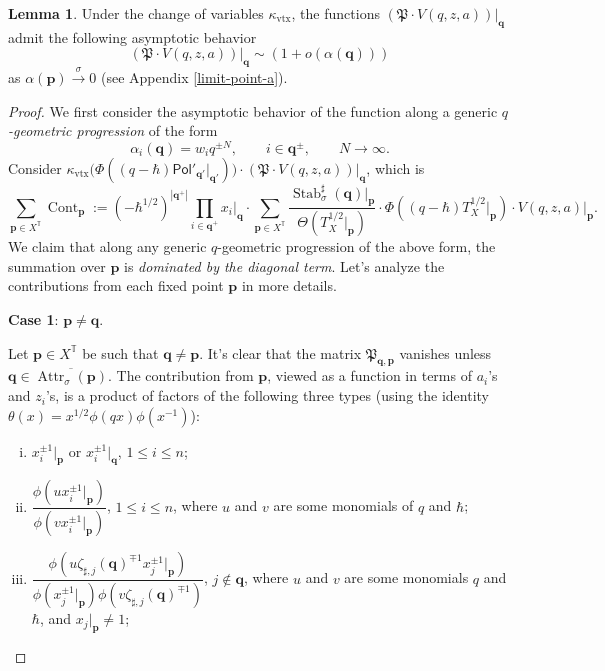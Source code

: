 \documentclass[10pt]{amsart}
\theoremstyle{definition}
\def\TT{\mathbb{T}}
\newcommand{\bp}{\mathbf{p}}
\newcommand{\bq}{\mathbf{q}}
\newcommand{\Attr}{\operatorname{Attr}}
\newcommand{\Cont}{\operatorname{Cont}}
\newcommand{\Stab}{\operatorname{Stab}}
\newcommand{\fP}{\mathfrak{P}}
\newcommand{\Pol}{\mathsf{Pol}}
\theoremstyle{definition}
\numberwithin{equation}{section}
\theoremstyle{Theorem}
\newtheorem{Lemma}[Definition]{Lemma}
\begin{document}
\begin{Lemma} \label{Criterion-2}
Under the change of variables $\kappa_{\mathrm{vtx}}$, the functions $( \fP \cdot V(q,z,a) ) \big|_\bq$ admit the following asymptotic behavior
$$
( \fP \cdot V(q,z,a) ) \big|_\bq \sim (1 + o(\alpha(\bq)))
$$
as $\alpha (\bp) \xrightarrow{\sigma} 0$ (see Appendix \ref{limit-point-a}).
\end{Lemma}

\begin{proof}
We first consider the asymptotic behavior of  the function along a generic \emph{$q$-geometric progression} of the form
$$
\alpha_i (\bq) = w_i q^{\pm N}, \qquad i\in \bq^\pm,  \qquad N\to \infty .
$$
Consider $\kappa_{\mathrm{vtx}} \Big( \Phi ((q-\hbar) \Pol'_{\bq'} |_{\bq'} ) \Big) \cdot (\fP \cdot V(q,z,a) ) \big|_\bq$, which is
$$
\sum_{\bp \in X^\TT} \Cont_\bp := (-\hbar^{1/2})^{|\bq^+|}  \prod_{i\in \bq^+} x_i |_\bq \cdot \sum_{\bp \in X^\TT}   \frac{ \Stab^\sharp_{\sigma} (\bq) |_\bp }{\Theta (T_X^{1/2} |_\bp ) } \cdot \Phi ((q-\hbar) T^{1/2}_X |_\bp )  \cdot V(q,z,a) \big|_\bp  .
$$
We claim that along any generic $q$-geometric progression of the above form, the summation over $\bp$ is \emph{dominated by the diagonal term}. Let's analyze the contributions from each fixed point $\bp$ in more details.

\textbf{Case 1}: $\bp \neq \bq$.

Let $\bp \in X^\TT$ be such that $\bq \neq \bp$. It's clear that the matrix $\fP_{\bq, \bp}$ vanishes unless $\bq\in \overline{\Attr_\sigma (\bp)}$.  The contribution from $\bp$, viewed as a function in terms of $a_i$'s and $z_i$'s, is a product of factors of the following three types (using the identity $\theta (x) = x^{1/2} \phi (qx) \phi (x^{-1})$):
\begin{enumerate}[(i)]
	
\setlength{\parskip}{1ex}
	
\item $x_i^{\pm 1} |_\bp$ or $x_i^{\pm 1} |_\bq$, $1\leq i\leq n$;

\item $\dfrac{\phi (u x_i^{\pm 1} |_\bp) }{\phi (v x_i^{\pm 1} |_\bp)}$, $1 \leq i\leq n$, where $u$ and $v$ are some monomials of $q$ and $\hbar$; 

\item $\dfrac{\phi (u \zeta_{\sharp, j} (\bq)^{\mp 1} x_j^{\pm 1} |_\bp) }{ \phi (x_j^{\pm 1} |_\bp) \phi (v \zeta_{\sharp, j} (\bq)^{\mp 1} )}$, $j\not\in \bq$, where $u$ and $v$ are some monomials $q$ and $\hbar$, and $x_j |_\bp \neq 1$;


\end{enumerate}
\end{proof}
\end{document}
